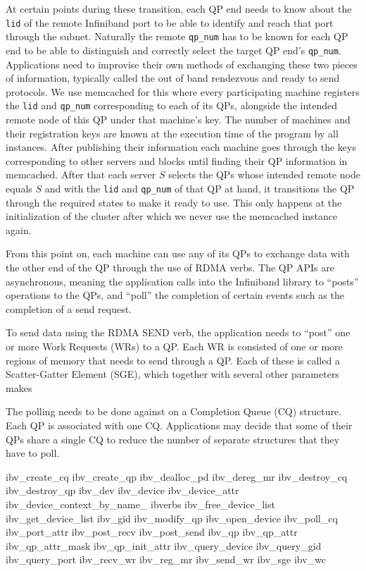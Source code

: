 At certain points during these transition, each
QP end needs to know about the \texttt{lid} of the remote Infiniband port to
be able to identify and reach that port through the subnet. Naturally the
remote \texttt{qp\_num} has to be known for each QP end to be able to
distinguish and correctly select the target QP end's \texttt{qp\_num}.
Applications need to improvise their own methods of exchanging these two
pieces of information, typically called the out of band rendezvous and ready to
send protocols. We use memcached for this where every participating machine
registers the \texttt{lid} and \texttt{qp\_num} corresponding to each of its
QPs, alongside the intended remote node of this QP under that machine's key.
The number of machines and their registration keys
are known at the execution time of the program by all instances. After
publishing their information each machine goes through the keys corresponding
to other servers and blocks until finding their QP information in memcached.
After that each server $S$ selects the QPs whose intended remote node equals
$S$ and with the \texttt{lid} and \texttt{qp\_num} of that QP at hand, it
transitions the QP through the required states to make it ready to use. This
only happens at the initialization of the cluster after which we never use
the memcached instance again.

From this point on, each machine can use any of its QPs to exchange data with
the other end of the QP through the use of RDMA verbs. The QP APIs are
asynchronous, meaning the application calls into the Infiniband library to
``posts'' operations to the QPs, and ``poll'' the completion of certain events
such as the completion of a send request.

To send data using the RDMA SEND verb, the application needs to ``post'' one
or more Work Requests (WRs) to a QP. Each WR is consisted of one or more
regions of memory that needs to send through a QP. Each of these
is called a Scatter-Gatter Element (SGE), which together with several other
parameters makes 


The polling needs to be done against on a Completion Queue (CQ) structure.
Each QP is associated with one CQ. Applications may decide that some of their
QPs share a single CQ to reduce the number of separate structures that they
have to poll.

ibv_create_cq
ibv_create_qp
ibv_dealloc_pd
ibv_dereg_mr
ibv_destroy_cq
ibv_destroy_qp
ibv_dev
ibv_device
ibv_device_attr
ibv_device_context_by_name_
ibverbs
ibv_free_device_list
ibv_get_device_list
ibv_gid
ibv_modify_qp
ibv_open_device
ibv_poll_cq
ibv_port_attr
ibv_post_recv
ibv_post_send
ibv_qp
ibv_qp_attr
ibv_qp_attr_mask
ibv_qp_init_attr
ibv_query_device
ibv_query_gid
ibv_query_port
ibv_recv_wr
ibv_reg_mr
ibv_send_wr
ibv_sge
ibv_wc

